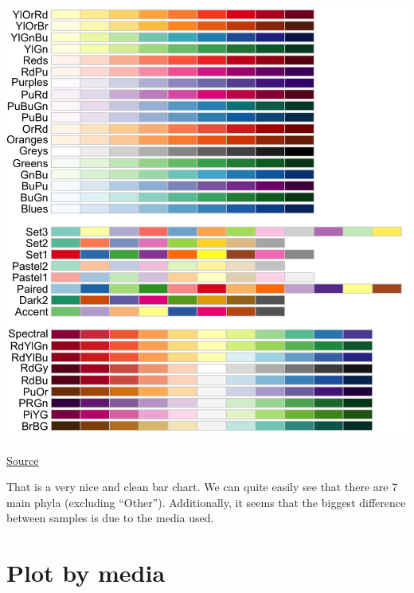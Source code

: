 \documentclass[
]{book}
\begin{document}
\begin{center}\includegraphics[width=800px]{figures/colour_brewer_palettes} \end{center}

\href{https://r-graph-gallery.com/38-rcolorbrewers-palettes.html}{Source}

That is a very nice and clean bar chart.
We can quite easily see that there are 7 main phyla (excluding ``Other'').
Additionally, it seems that the biggest difference between samples is due to the media used.

\hypertarget{plot-by-media}{%
\section{Plot by media}\label{plot-by-media}}
\end{document}
